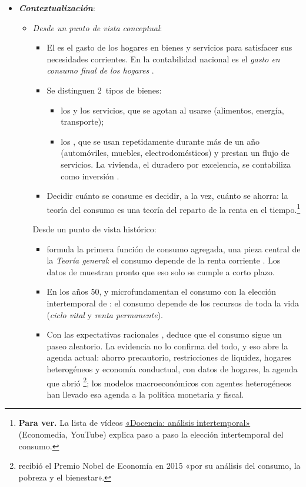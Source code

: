 \documentclass[11pt]{article}
\begin{document}
\begin{itemize}
\item \textbf{\emph{Contextualización}}:
  \begin{itemize}
  \item \emph{Desde un punto de vista conceptual}:
  \begin{itemize}
  \item El  es el gasto de los hogares en bienes y servicios para satisfacer sus necesidades corrientes. En la contabilidad nacional es el \emph{gasto en consumo final de los hogares} .
  \item Se distinguen 2~tipos de bienes:
    \begin{itemize}
    \item los  y los servicios, que se agotan al usarse (alimentos, energía, transporte);
    \item los , que se usan repetidamente durante más de un año (automóviles, muebles, electrodomésticos) y prestan un flujo de servicios. La vivienda, el duradero por excelencia, se contabiliza como inversión .
    \end{itemize}
  \item Decidir cuánto se consume es decidir, a la vez, cuánto se ahorra: la teoría del consumo es una teoría del reparto de la renta en el tiempo.\footnote{\textbf{Para ver.} La lista de vídeos \href{https://www.youtube.com/playlist?list=PLxSnKD5fMpRZtVhDUrHaKzlB-ccj3Oukh}{«Docencia: análisis intertemporal»} (Economedia, YouTube) explica paso a paso la elección intertemporal del consumo.}
  \end{itemize}
  Desde un punto de vista histórico:
  \begin{itemize}
  \item \textcite{Keynes1936} formula la primera función de consumo agregada, una pieza central de la \emph{Teoría general}: el consumo depende de la renta corriente . Los datos de  muestran pronto que eso solo se cumple a corto plazo.
  \item En los años 50, \textcite{ModiglianiBrumberg1954} y \textcite{Friedman1957} microfundamentan el consumo con la elección intertemporal de \textcite{Fisher1930Theory}: el consumo depende de los recursos de toda la vida (\emph{ciclo vital} y \emph{renta permanente}).
  \item Con las expectativas racionales , \textcite{Hall1978} deduce que el consumo sigue un paseo aleatorio. La evidencia no lo confirma del todo, y eso abre la agenda actual: ahorro precautorio, restricciones de liquidez, hogares heterogéneos y economía conductual, con datos de hogares, la agenda que abrió \footnote{ recibió el Premio Nobel de Economía en 2015 «por su análisis del consumo, la pobreza y el bienestar»\nocite{Nobel2015Deaton}.}; los modelos macroeconómicos con agentes heterogéneos han llevado esa agenda a la política monetaria y fiscal\nocite{KaplanMollViolante2018Monetary}.

\end{itemize}
\end{itemize}
\end{itemize}
\end{document}

